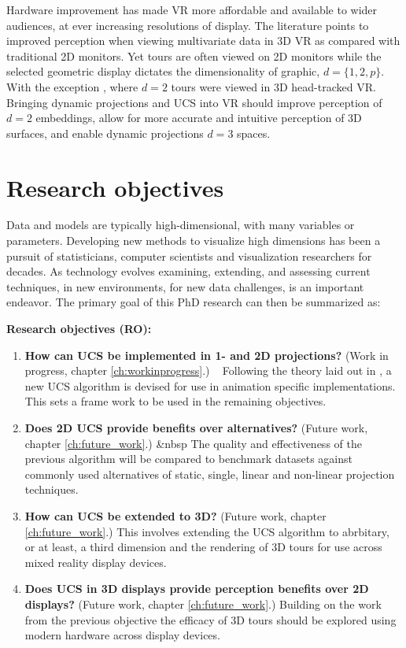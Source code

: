 \documentclass{monashthesis}
\begin{document}
Hardware improvement has made VR more affordable and available to wider
audiences, at ever increasing resolutions of display. The literature
points to improved perception when viewing multivariate data in 3D VR as
compared with traditional 2D monitors. Yet tours are often viewed on 2D
monitors while the selected geometric display dictates the
dimensionality of graphic, \(d=\{1, 2, p\}\). With the exception
\textcite{nelson_xgobi_1998}, where \(d=2\) tours were viewed in 3D
head-tracked VR. Bringing dynamic projections and UCS into VR should
improve perception of \(d=2\) embeddings, allow for more accurate and
intuitive perception of 3D surfaces, and enable dynamic projections
\(d=3\) spaces.

\section{Research objectives}\label{research-objectives}

Data and models are typically high-dimensional, with many variables or
parameters. Developing new methods to visualize high dimensions has been
a pursuit of statisticians, computer scientists and visualization
researchers for decades. As technology evolves examining, extending, and
assessing current techniques, in new environments, for new data
challenges, is an important endeavor. The primary goal of this PhD
research can then be summarized as:

\textbf{Research objectives (RO):}

\begin{enumerate}
\def\labelenumi{\arabic{enumi}.}
\tightlist
\item
  \textbf{How can UCS be implemented in 1- and 2D projections?} (Work in
  progress, chapter \ref{ch:workinprogress}.) ~ Following the theory
  laid out in \textcite{cook_manual_1997}, a new UCS algorithm is
  devised for use in animation specific implementations. This sets a
  frame work to be used in the remaining objectives.
\item
  \textbf{Does 2D UCS provide benefits over alternatives?} (Future work,
  chapter \ref{ch:future_work}.) \&nbsp The quality and effectiveness of
  the previous algorithm will be compared to benchmark datasets against
  commonly used alternatives of static, single, linear and non-linear
  projection techniques.
\item
  \textbf{How can UCS be extended to 3D?} (Future work, chapter
  \ref{ch:future_work}.) This involves extending the UCS algorithm to
  abrbitary, or at least, a third dimension and the rendering of 3D
  tours for use across mixed reality display devices.
\item
  \textbf{Does UCS in 3D displays provide perception benefits over 2D
  displays?} (Future work, chapter \ref{ch:future_work}.) Building on
  the work from the previous objective the efficacy of 3D tours should
  be explored using modern hardware across display devices.
\end{enumerate}
\end{document}
